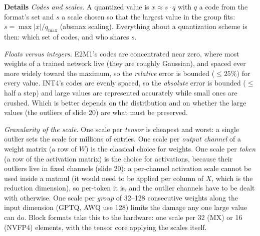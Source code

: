 \documentclass[11pt,letterpaper]{article}
\newcommand{\para}[1]{\medskip\noindent\textbf{#1}\quad}
\begin{document}
\para{Details} \emph{Codes and scales.} A quantized value is $x\approx s\cdot q$ with $q$ a code from the format's set and $s$ a scale chosen so that the largest value in the group fits: $s=\max|x|/q_{\max}$ (absmax scaling). Everything about a quantization scheme is then: which set of codes, and who shares $s$.

\emph{Floats versus integers.} E2M1's codes are concentrated near zero, where most weights of a trained network live (they are roughly Gaussian), and spaced ever more widely toward the maximum, so the \emph{relative} error is bounded ($\le25\%$) for every value. INT4's codes are evenly spaced, so the \emph{absolute} error is bounded ($\le$ half a step) and large values are represented accurately while small ones are crushed. Which is better depends on the distribution and on whether the large values (the outliers of slide 20) are what must be preserved.

\emph{Granularity of the scale.} One scale per \emph{tensor} is cheapest and worst: a single outlier sets the scale for millions of entries. One scale per \emph{output channel} of a weight matrix (a row of $W$) is the classical choice for weights. One scale per \emph{token} (a row of the activation matrix) is the choice for activations, because their outliers live in fixed channels (slide 20): a per-channel activation scale cannot be used inside a matmul (it would need to be applied per column of $X$, which is the reduction dimension), so per-token it is, and the outlier channels have to be dealt with otherwise. One scale per \emph{group} of 32--128 consecutive weights along the input dimension (GPTQ, AWQ use 128) limits the damage any one large value can do. Block formats take this to the hardware: one scale per 32 (MX) or 16 (NVFP4) elements, with the tensor core applying the scales itself.
\end{document}
